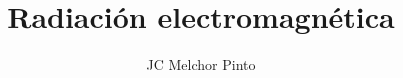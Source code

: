 \documentclass[12pt,addpoints,answers]{guia}
\title{Radiación electromagnética}
\author{JC Melchor Pinto}
\begin{document}
\INFO%
\begin{questions}
    \questionboxed[25]{}
    \questionboxed[25]{}
\end{questions}
\end{document}
